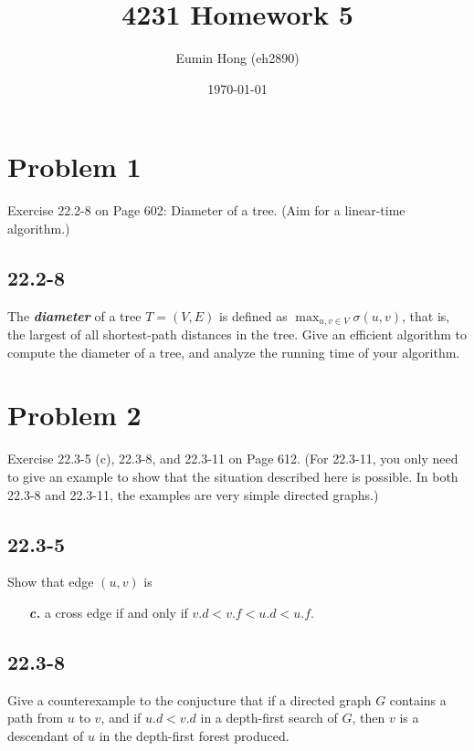 \documentclass{../../class}
\title{4231 Homework 5}
\author{Eumin Hong (eh2890)}
\date{\today}
\begin{document}
\maketitle



\section*{Problem 1}
\begin{tcolorbox}
    Exercise 22.2-8 on Page 602: Diameter of a tree. (Aim for a linear-time algorithm.)
\end{tcolorbox}

\subsection*{22.2-8}
The \textbf{\textit{diameter}} of a tree $T = (V, E)$ is defined as $\max_{u, v\in V} \sigma(u, v)$, that is, the largest of all shortest-path distances in the tree. Give an efficient algorithm to compute the diameter of a tree, and analyze the running time of your algorithm.

\newpage
\section*{Problem 2}
\begin{tcolorbox}
    Exercise 22.3-5 (c), 22.3-8, and 22.3-11 on Page 612. (For 22.3-11, you only need to give an example to show that the situation described here is possible. In both 22.3-8 and 22.3-11, the examples are very simple directed graphs.)
\end{tcolorbox}

\subsection*{22.3-5}
Show that edge $(u, v)$ is
\begin{itemize}
    \item[\textbf{\textit{c.}}] a cross edge if and only if $v.d < v.f < u.d < u.f$.
\end{itemize}

\subsection*{22.3-8}
Give a counterexample to the conjucture that if a directed graph $G$ contains a path from $u$ to $v$, and if $u.d < v.d$ in a depth-first search of $G$, then $v$ is a descendant of $u$ in the depth-first forest produced.
\end{document}
